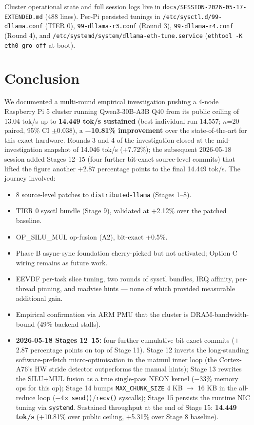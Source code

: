 \documentclass[10pt,a4paper]{article}
\begin{document}
Cluster operational state and full session logs live in \texttt{docs/SESSION-2026-05-17-EXTENDED.md} (488 lines). Per-Pi persisted tunings in \texttt{/etc/sysctl.d/99-dllama.conf} (TIER 0), \texttt{99-dllama-r3.conf} (Round 3), \texttt{99-dllama-r4.conf} (Round 4), and \texttt{/etc/systemd/system/dllama-eth-tune.service} (\texttt{ethtool -K eth0 gro off} at boot).

\section{Conclusion}

We documented a multi-round empirical investigation pushing a 4-node Raspberry Pi 5 cluster running Qwen3-30B-A3B Q40 from its public ceiling of 13.04 tok/s up to \textbf{14.449 tok/s sustained} (best individual run 14.557; $n$=20 paired, 95\% CI $\pm$0.038), a \textbf{+10.81\% improvement} over the state-of-the-art for this exact hardware. Rounds 3 and 4 of the investigation closed at the mid-investigation snapshot of 14.046 tok/s ($+$7.72\%); the subsequent 2026-05-18 session added Stages 12--15 (four further bit-exact source-level commits) that lifted the figure another $+$2.87 percentage points to the final 14.449 tok/s. The journey involved:

\begin{itemize}[leftmargin=*,nosep]
  \item 8 source-level patches to \texttt{distributed-llama} (Stages 1--8).
  \item TIER 0 sysctl bundle (Stage 9), validated at +2.12\% over the patched baseline.
  \item OP\_SILU\_MUL op-fusion (A2), bit-exact +0.5\%.
  \item Phase B async-sync foundation cherry-picked but not activated; Option C wiring remains as future work.
  \item EEVDF per-task slice tuning, two rounds of sysctl bundles, IRQ affinity, per-thread pinning, and madvise hints --- none of which provided measurable additional gain.
  \item Empirical confirmation via ARM PMU that the cluster is DRAM-bandwidth-bound (49\% backend stalls).
  \item \textbf{2026-05-18 Stages 12--15:} four further cumulative bit-exact commits ($+$2.87 percentage points on top of Stage 11). Stage 12 inverts the long-standing software-prefetch micro-optimisation in the matmul inner loop (the Cortex-A76's HW stride detector outperforms the manual hints); Stage 13 rewrites the SILU+MUL fusion as a true single-pass NEON kernel ($-$33\% memory ops for this op); Stage 14 bumps \texttt{MAX\_CHUNK\_SIZE} 4 KB $\to$ 16 KB in the all-reduce loop ($-$4$\times$ \texttt{send()}/\texttt{recv()} syscalls); Stage 15 persists the runtime NIC tuning via \texttt{systemd}. Sustained throughput at the end of Stage 15: \textbf{14.449 tok/s} ($+$10.81\% over public ceiling, $+$5.31\% over Stage 8 baseline).
\end{itemize}
\end{document}
